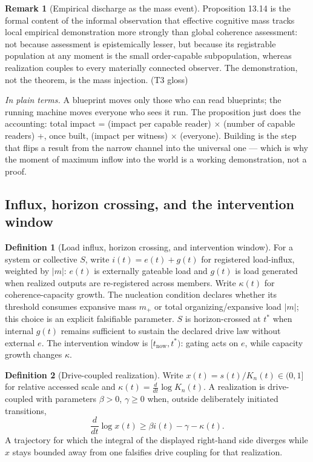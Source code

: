 \documentclass[11pt]{article}
\theoremstyle{definition}
\newtheorem{definition}{Definition}
\newtheorem{remark}{Remark}
\newcommand{\plainterms}{\emph{In plain terms.}}
\begin{document}
\begin{remark}[Empirical discharge as the mass event]
Proposition 13.14 is the formal content of the informal observation that effective cognitive mass tracks local empirical demonstration more strongly than global coherence assessment: not because assessment is epistemically lesser, but because its registrable population at any moment is the small order-capable subpopulation, whereas realization couples to every materially connected observer. The demonstration, not the theorem, is the mass injection. (T3 gloss)
\end{remark}

\noindent\plainterms{} A blueprint moves only those who can read blueprints; the running machine moves everyone who sees it run. The proposition just does the accounting: total impact = (impact per capable reader) $\times$ (number of capable readers) +, once built, (impact per witness) $\times$ (everyone). Building is the step that flips a result from the narrow channel into the universal one --- which is why the moment of maximum inflow into the world is a working demonstration, not a proof.

\subsection{Influx, horizon crossing, and the intervention window}

\begin{definition}[Load influx, horizon crossing, and intervention window]
For a system or collective $S$, write $i(t) = e(t) + g(t)$ for registered load-influx, weighted by $|m|$: $e(t)$ is externally gateable load and $g(t)$ is load generated when realized outputs are re-registered across members. Write $\kappa(t)$ for coherence-capacity growth. The nucleation condition declares whether its threshold consumes expansive mass $m_+$ or total organizing/expansive load $|m|$; this choice is an explicit falsifiable parameter. $S$ is horizon-crossed at $t^{*}$ when internal $g(t)$ remains sufficient to sustain the declared drive law without external $e$. The intervention window is $[t_{\mathrm{now}}, t^{*})$: gating acts on $e$, while capacity growth changes $\kappa$.
\end{definition}

\begin{definition}[Drive-coupled realization]
Write $x(t) = s(t)/K_n(t) \in (0, 1]$ for relative accessed scale and $\kappa(t) = \tfrac{d}{dt} \log K_n(t)$. A realization is drive-coupled with parameters $\beta > 0$, $\gamma \geq 0$ when, outside deliberately initiated transitions,
\begin{equation}
\frac{d}{dt} \log x(t) \geq \beta i(t) - \gamma - \kappa(t). \tag{S47}
\end{equation}
A trajectory for which the integral of the displayed right-hand side diverges while $x$ stays bounded away from one falsifies drive coupling for that realization.
\end{definition}
\end{document}
